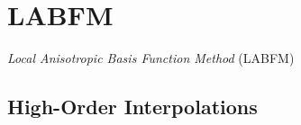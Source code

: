


\section{LABFM}

\cite{king2024MeshFreeFrameworkHighOrder, king2020HighOrderDifference, king2024MeshfreeFrameworkHighorder, king2022HighorderSimulationsIsothermal, king2024SunsetFlamesDNSCode}

\emph{Local Anisotropic Basis Function Method} (LABFM)



\subsection{High-Order Interpolations}


